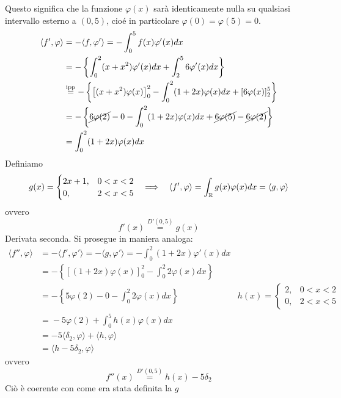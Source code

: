 Questo significa che la funzione $\varphi (x)$ sarà identicamente nulla su qualsiasi intervallo esterno a $(0, 5)$, cioé in particolare $\varphi (0) = \varphi (5) = 0$.
\begin{align*}
\langle f', \varphi \rangle & = - \langle f, \varphi'\rangle = - \int^{5}_{0} f(x)\varphi'(x)dx\\
 & = - \left\{\int^{2}_{0} (x + x^{2})\varphi'(x)dx + \int^{5}_{2} 6\varphi'(x)dx\right\}\\
 & \overset{\text{ipp}}{=} - \left\{\left[ (x + x^{2})\varphi (x)\right]^{2}_{0} - \int^{2}_{0} (1 + 2x)\varphi (x)dx + [ 6\varphi (x)]^{5}_{2}\right\}\\
 & = - \left\{\cancel{6\varphi (2)} - 0 - \int^{2}_{0}(1 + 2x) \varphi (x) dx + \cancel{6\varphi (5)} - \cancel{6\varphi (2)}\right\}\\
 & = \int^{2}_{0}(1 + 2x) \varphi (x) dx
\end{align*}
Definiamo
\begin{equation*}
g(x) =
\begin{cases}
2x + 1, & 0 < x < 2\\
0, & 2 < x < 5
\end{cases} \ \ \implies \ \ \langle f', \varphi \rangle = \int_{\mathbb{R}} g(x) \varphi (x) dx = \langle g, \varphi \rangle
\end{equation*}
ovvero
\begin{equation*}
f'(x)\overset{D'(0, 5)}{=} g(x)
\end{equation*}
Derivata seconda. Si prosegue in maniera analoga:
\begin{equation*}
\begin{aligned}
\langle f'', \varphi \rangle & = - \langle f', \varphi'\rangle = - \langle g, \varphi'\rangle = - \int^{2}_{0} (1 + 2x)\varphi'(x)dx & \\
 & = - \left\{[ (1 + 2x)\varphi (x)]^{2}_{0} - \int^{2}_{0} 2\varphi (x)dx\right\} & \\
 & = - \left\{5\varphi (2) - 0 - \int^{2}_{0} 2\varphi (x)dx\right\} & h(x) =
\begin{cases}
2, & 0 < x < 2\\
0, & 2 < x < 5
\end{cases}\\
 & \overset{}{=} - 5\varphi (2) + \int^{5}_{0} h(x)\varphi (x)dx & \\
 & = - 5\langle \delta_{2}, \varphi \rangle + \langle h, \varphi \rangle & \\
 & = \langle h - 5\delta_{2}, \varphi \rangle &
\end{aligned}
\end{equation*}
ovvero
\begin{equation*}
f''(x)\overset{D'(0, 5)}{=} h(x) - 5\delta_{2}
\end{equation*}
Ciò è coerente con come era stata definita la $g$


